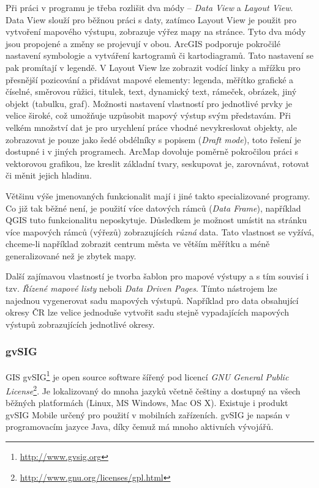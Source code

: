 \documentclass[a4paper,12pt,draft]{article}
\begin{document}
Při práci v programu je třeba rozlišit dva módy -- \emph{Data View}
a \emph{Layout View}. Data View slouží pro běžnou práci s daty,
zatímco Layout View je použit pro vytvoření mapového výstupu,
zobrazuje výřez mapy na stránce. Tyto dva módy jsou propojené a
změny se projevují v obou. ArcGIS podporuje pokročilé nastavení
symbologie a vytváření kartogramů či kartodiagramů. Tato nastavení se
pak promítají v legendě. V Layout View lze zobrazit vodící linky a
mřížku pro přesnější pozicování  a  přidávat mapové elementy:
legenda, měřítko grafické a číselné, směrovou růžici, titulek,
text, dynamický text, rámeček, obrázek, jiný objekt (tabulku, graf).
Možnosti nastavení vlastností pro jednotlivé prvky je velice široké,
což umožňuje uzpůsobit mapový výstup svým představám. Při velkém
množství dat je pro urychlení práce vhodné nevykreslovat objekty, ale
zobrazovat je pouze jako šedé obdélníky s popisem (\emph{Draft mode}),
toto řešení je dostupné i v jiných programech. ArcMap dovoluje poměrně
pokročilou práci s vektorovou grafikou, lze kreslit základní tvary,
seskupovat je, zarovnávat, rotovat či měnit jejich hladinu.

Většinu výše jmenovaných funkcionalit mají i jiné takto
specializované programy. Co již tak běžné není, je použití více
datových rámců (\emph{Data Frame}), například QGIS tuto funkcionalitu
neposkytuje. Důsledkem je možnost umístit na stránku více mapových
rámců (výřezů) zobrazujících \emph{různá} data. Tato vlastnost
se vyžívá, chceme-li například zobrazit centrum města ve větším
měřítku a méně generalizované než je zbytek mapy.

Další zajímavou vlastností je tvorba šablon pro mapové výstupy a
s tím souvisí i tzv. \emph{Řízené mapové listy} neboli \emph{Data
Driven Pages}. Tímto nástrojem lze najednou vygenerovat sadu mapových
výstupů. Například pro data obsahující okresy ČR lze velice jednoduše
vytvořit sadu stejně vypadajících mapových výstupů zobrazujících
jednotlivé okresy.


\subsubsection{gvSIG}
GIS gvSIG\footnote{\url{http://www.gvsig.org}} je open source software šířený
pod licencí \emph{GNU General Public
License}\footnote{\url{http://www.gnu.org/licenses/gpl.html}}. Je
lokalizovaný do mnoha jazyků včetně češtiny a dostupný na všech
běžných platformách (Linux, MS Windows, Mac OS X). Existuje i produkt gvSIG
Mobile určený pro použití v mobilních zařízeních. gvSIG je napsán
v programovacím jazyce Java, díky čemuž má mnoho aktivních vývojářů.
\end{document}
